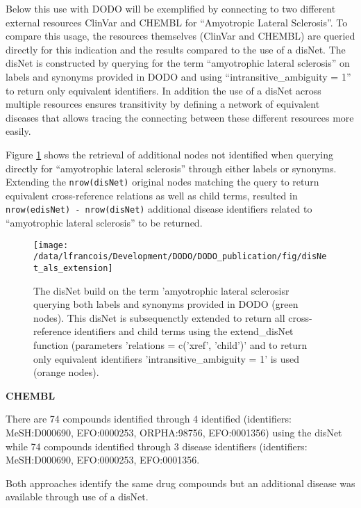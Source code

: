 \documentclass[9pt,a4paper,]{extarticle}
\begin{document}
Below this use with DODO will be exemplified by connecting to two different external resources ClinVar and CHEMBL for ``Amyotropic Lateral Sclerosis''. To compare this usage, the resources themselves (ClinVar and CHEMBL) are queried directly for this indication and the results compared to the use of a disNet. The disNet is constructed by querying for the term ``amyotrophic lateral sclerosis'' on labels and synonyms provided in DODO and using ``intransitive\_ambiguity = 1'' to return only equivalent identifiers. In addition the use of a disNet across multiple resources ensures transitivity by defining a network of equivalent diseases that allows tracing the connecting between these different resources more easily.

Figure \ref{fig:disNetalsExtension} shows the retrieval of additional nodes not identified when querying directly for ``amyotrophic lateral sclerosis'' through either labels or synonyms. Extending the \texttt{nrow(disNet)} original nodes matching the query to return equivalent cross-reference relations as well as child terms, resulted in \texttt{nrow(edisNet)\ -\ nrow(disNet)} additional disease identifiers related to ``amyotrophic lateral sclerosis'' to be returned.

\begin{figure}

{\centering \texttt{[image: /data/lfrancois/Development/DODO/DODO\_publication/fig/disNet\_als\_extension]} 

}

\caption{The disNet build on the term 'amyotrophic lateral sclerosisr querying both labels and synonyms provided in DODO (green nodes). This disNet is subsequenctly extended to return all cross-reference identifiers and child terms using the extend\_disNet function (parameters 'relations = c('xref', 'child')' and to return only equivalent identifiers 'intransitive\_ambiguity = 1' is used (orange nodes).}\label{fig:disNetalsExtension}
\end{figure}

\textbf{CHEMBL}

There are 74 compounds identified through 4 identified (identifiers: MeSH:D000690, EFO:0000253, ORPHA:98756, EFO:0001356) using the disNet while 74 compounds identified through 3 disease identifiers (identifiers: MeSH:D000690, EFO:0000253, EFO:0001356.

Both approaches identify the same drug compounds but an additional disease was available through use of a disNet.
\end{document}
